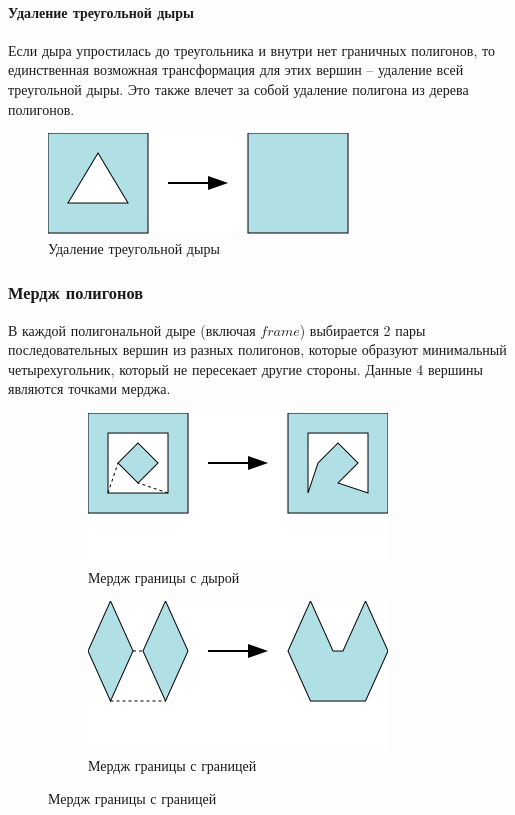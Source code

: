 \documentclass{fefu_thesis/cls/fefu}
\begin{document}
    \paragraph{Удаление треугольной дыры}
    Если дыра упростилась до треугольника и внутри нет граничных полигонов, то единственная возможная трансформация для этих вершин -- удаление всей треугольной дыры. Это также влечет за собой удаление полигона из дерева полигонов.

    \begin{figure}[H]
        \centering
        \includegraphics[scale=1]{images/remove_triangular_hole.png}
        \caption{Удаление треугольной дыры}
    \end{figure}

    \subsubsection{Мердж полигонов}
    В каждой полигональной дыре (включая $frame$) выбирается 2 пары последовательных вершин из разных полигонов, которые образуют минимальный четырехугольник, который не пересекает другие стороны. Данные 4 вершины являются точками мерджа.
    \begin{figure}[H]
        \centering
        \begin{subfigure}[t]{\linewidth}
            \centering
            \includegraphics[scale=1]{images/polygonmerge.png}
            \caption{Мердж границы с дырой}
        \end{subfigure}
        \begin{subfigure}[t]{\linewidth}
            \centering
            \includegraphics[scale=1]{images/polygonmerge2.png}
            \caption{Мердж границы с границей}
        \end{subfigure}
    \end{figure}
\end{document}
